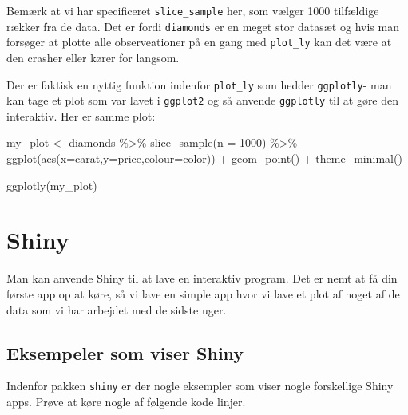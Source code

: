 \documentclass[
]{book}
\newenvironment{Shaded}{\begin{snugshade}}{\end{snugshade}}
\newcommand{\AttributeTok}[1]{\textcolor[rgb]{0.77,0.63,0.00}{#1}}
\newcommand{\DecValTok}[1]{\textcolor[rgb]{0.00,0.00,0.81}{#1}}
\newcommand{\FunctionTok}[1]{\textcolor[rgb]{0.00,0.00,0.00}{#1}}
\newcommand{\NormalTok}[1]{#1}
\newcommand{\OtherTok}[1]{\textcolor[rgb]{0.56,0.35,0.01}{#1}}
\newcommand{\SpecialCharTok}[1]{\textcolor[rgb]{0.00,0.00,0.00}{#1}}
\begin{document}
Bemærk at vi har specificeret \texttt{slice\_sample} her, som vælger 1000 tilfældige rækker fra de data. Det er fordi \texttt{diamonds} er en meget stor datasæt og hvis man forsøger at plotte alle observeationer på en gang med \texttt{plot\_ly} kan det være at den crasher eller kører for langsom.

Der er faktisk en nyttig funktion indenfor \texttt{plot\_ly} som hedder \texttt{ggplotly}- man kan tage et plot som var lavet i \texttt{ggplot2} og så anvende \texttt{ggplotly} til at gøre den interaktiv. Her er samme plot:

\begin{Shaded}
\begin{Highlighting}[]
\NormalTok{my\_plot }\OtherTok{\textless{}{-}}\NormalTok{ diamonds }\SpecialCharTok{\%\textgreater{}\%} \FunctionTok{slice\_sample}\NormalTok{(}\AttributeTok{n =} \DecValTok{1000}\NormalTok{) }\SpecialCharTok{\%\textgreater{}\%}
  \FunctionTok{ggplot}\NormalTok{(}\FunctionTok{aes}\NormalTok{(}\AttributeTok{x=}\NormalTok{carat,}\AttributeTok{y=}\NormalTok{price,}\AttributeTok{colour=}\NormalTok{color)) }\SpecialCharTok{+} 
  \FunctionTok{geom\_point}\NormalTok{() }\SpecialCharTok{+} 
  \FunctionTok{theme\_minimal}\NormalTok{()}

\FunctionTok{ggplotly}\NormalTok{(my\_plot)}
\end{Highlighting}
\end{Shaded}

\hypertarget{shiny}{%
\section{Shiny}\label{shiny}}

Man kan anvende Shiny til at lave en interaktiv program. Det er nemt at få din første app op at køre, så vi lave en simple app hvor vi lave et plot af noget af de data som vi har arbejdet med de sidste uger.

\hypertarget{eksempeler-som-viser-shiny}{%
\subsection{Eksempeler som viser Shiny}\label{eksempeler-som-viser-shiny}}

Indenfor pakken \texttt{shiny} er der nogle eksempler som viser nogle forskellige Shiny apps. Prøve at køre nogle af følgende kode linjer.
\end{document}
